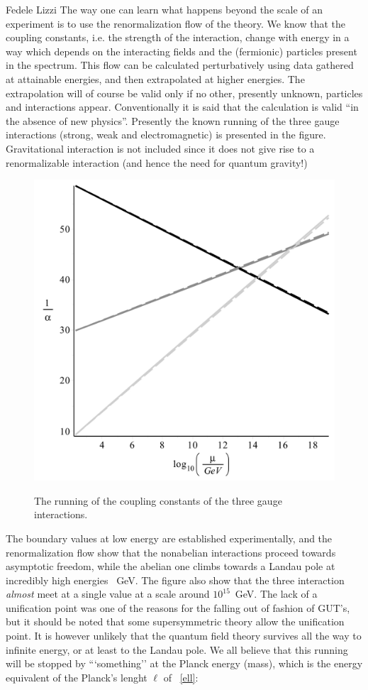 \begin{artengenv}{Fedele Lizzi}
The way one can learn what happens beyond the scale of an experiment is to use the renormalization flow of the theory. We know that the coupling constants, i.e. the strength of the interaction, change with energy in a way which depends on the interacting fields and the (fermionic) particles present in the spectrum. This flow can be calculated perturbatively using data gathered at attainable energies, and then extrapolated at higher energies. The extrapolation will of course be valid only if no other, presently unknown, particles and interactions appear. Conventionally it is said that the calculation is valid ``in the absence of new physics''. Presently the known running of the three gauge interactions (strong, weak and electromagnetic) is presented in the figure. Gravitational interaction is not included since it does not give rise to a renormalizable interaction (and hence the need for quantum gravity!)
\begin{figure}[htb]
{\centering
\includegraphics[width=.9\textwidth]{SPE_Lizzi/gaugerun-druk.pdf}
}
\caption{The running of the coupling constants of the three gauge interactions.}
\end{figure}
The boundary values at low energy are established experimentally, and the renormalization flow show that the nonabelian interactions proceed towards asymptotic freedom, while the abelian one climbs towards a Landau pole at incredibly high energies ~{GeV}. The figure also show that the three interaction \emph{almost} meet at a single value at a scale around $10^{15}$~GeV. The lack of a unification point was one of the reasons for the falling out of fashion of GUT's, but it should be noted that some supersymmetric theory allow the unification point. It is however unlikely that the quantum field theory survives all the way to infinite energy, or at least to the Landau pole. We all believe that this running will be stopped by {```something''} at the Planck energy (mass), which is the energy equivalent of the Planck's lenght $\ell$ of ~\eqref{ell}:

\end{artengenv}
